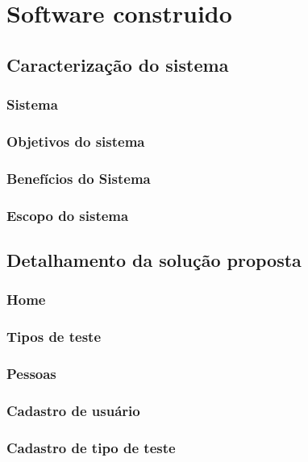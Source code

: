 \chapter{Software construido}

\section{Caracterização do sistema}

\subsection{Sistema}

\subsection{Objetivos do sistema}

\subsection{Benefícios do Sistema}

\subsection{Escopo do sistema}

\section{Detalhamento da solução proposta}

\subsection{Home}

\subsection{Tipos de teste}

\subsection{Pessoas}

\subsection{Cadastro de usuário}

\subsection{Cadastro de tipo de teste}

